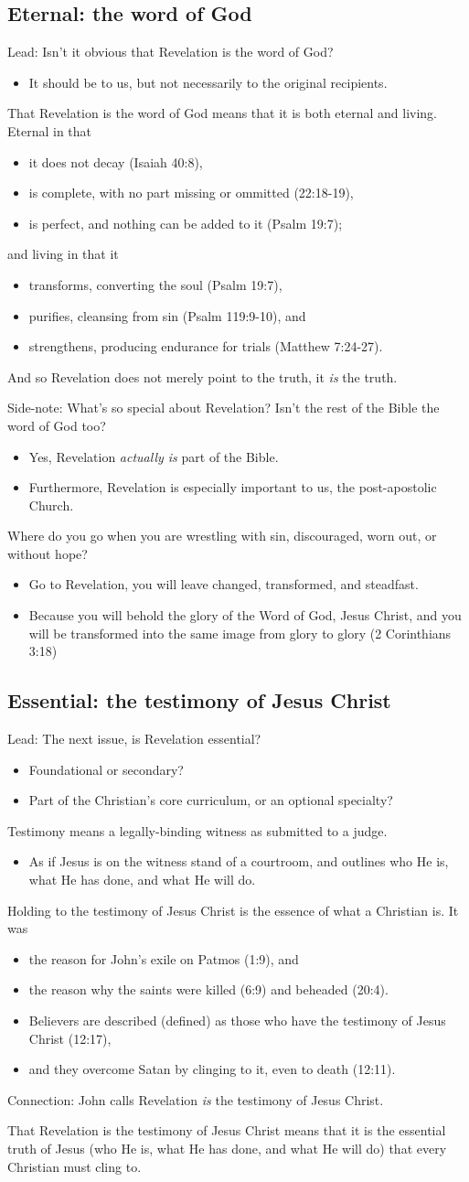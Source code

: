 \documentclass[12pt]{article}
\newcommand{\BI}{\begin{itemize}}
\newcommand{\EI}{\end{itemize}}
\newcommand{\I}{\item}
\begin{document}
\subsection{Eternal: the word of God}
\I  Lead: Isn't it obvious that Revelation is the word of God?
\BI \I It should be to us, but not necessarily to the original recipients. \EI
\I  That Revelation is the word of God means that it is both eternal and living.
    Eternal in that 
\BI \I  it does not decay (Isaiah 40:8),
    \I  is complete, with no part missing or ommitted (22:18-19),
    \I  is perfect, and nothing can be added to it (Psalm 19:7);
\EI
    and living in that it
\BI \I  transforms, converting the soul (Psalm 19:7),
    \I  purifies, cleansing from sin (Psalm 119:9-10), and
    \I  strengthens, producing endurance for trials (Matthew 7:24-27).
\EI
\I  And so Revelation does not merely point to the truth, it \emph{is} the truth.
\I  Side-note: What's so special about Revelation? 
    Isn't the rest of the Bible the word of God too?
\BI \I  Yes, Revelation \emph{actually is} part of the Bible.
    \I  Furthermore, Revelation is especially important to us, the post-apostolic Church. \EI
\I  Where do you go when you are wrestling with sin, discouraged, worn out, or without hope?
\BI \I  Go to Revelation, you will leave changed, transformed, and steadfast. 
    \I  Because you will behold the glory of the Word of God, Jesus Christ,
        and you will be transformed into the same image from glory to glory (2 Corinthians 3:18) \EI

\subsection{Essential: the testimony of Jesus Christ}
\I  Lead: The next issue, is Revelation essential?
\BI \I Foundational or secondary?
    \I Part of the Christian's core curriculum, or an optional specialty?
\EI
\I  Testimony means a legally-binding witness as submitted to a judge.
\BI \I  As if Jesus is on the witness stand of a courtroom, and outlines 
        who He is, what He has done, and what He will do. \EI
\I  Holding to the testimony of Jesus Christ is the essence of what a Christian is. It was 
\BI \I  the reason for John's exile on Patmos (1:9), and
    \I  the reason why the saints were killed (6:9) and beheaded (20:4).
    \I  Believers are described (defined) as those who have the testimony of Jesus Christ (12:17),
    \I  and they overcome Satan by clinging to it, even to death (12:11).
\EI
\I  Connection: John calls Revelation \emph{is} the testimony of Jesus Christ.
\I  That Revelation is the testimony of Jesus Christ means that it is the essential truth of Jesus 
    (who He is, what He has done, and what He will do)
    that every Christian must cling to.
\end{document}
